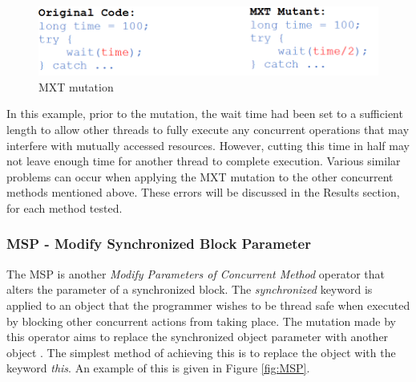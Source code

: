 \documentclass[a4paper,12pt]{article}
\begin{document}
\begin{figure}[h]
    \centering
    \includegraphics[scale = 0.55]{MXT.png}
    \caption{MXT mutation \citep{bradbury06}}
    \label{fig:MXT}
\end{figure}

In this example, prior to the mutation, the wait time had been set to a sufficient length to allow other threads to fully execute any concurrent operations that may interfere with mutually accessed resources. However, cutting this time in half may not leave enough time for another thread to complete execution. Various similar problems can occur when applying the MXT mutation to the other concurrent methods mentioned above. These errors will be discussed in the Results section, for each method tested.  

\subsubsection{MSP - Modify Synchronized Block Parameter}
	
The MSP is another \textit{Modify Parameters of Concurrent Method} operator that alters the parameter of a synchronized block. The \textit{synchronized} keyword is applied to an object that the programmer wishes to be thread safe when executed by blocking other concurrent actions from taking place. The mutation made by this operator aims to replace the synchronized object parameter with another object \citep{bradbury06}. The simplest method of achieving this is to replace the object with the keyword \textit{this}. An example of this is given in Figure \ref{fig:MSP}.
\end{document}
